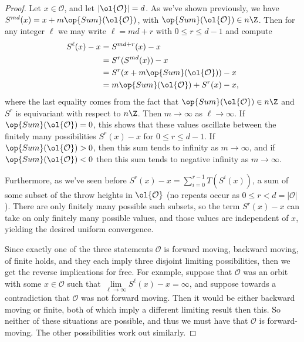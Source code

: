\documentclass[12nt]{article}
\theoremstyle{plain}
\begin{document}
\begin{proof}
Let $x \in \mathcal{O}$, and let $|\ol{\mathcal{O}}| = d$. As we've shown previously, we have $S^{md}(x) = x + m\op{Sum}(\ol{\mathcal{O}})$, with $\op{Sum}(\ol{\mathcal{O}}) \in n\Z$. Then for any integer $\ell$ we may write $\ell = md + r$ with $0 \leq r \leq d - 1$ and compute
\begin{align*}
S^{\ell}(x) - x &= S^{md + r}(x) - x \\
	&= S^r(S^{md}(x)) - x \\
	&= S^r(x + m \op{Sum}(\ol{\mathcal{O}})) - x \\
	&=  m \op{Sum}(\ol{\mathcal{O}}) + S^r(x)  - x,
\end{align*}
where the last equality comes from the fact that $\op{Sum}(\ol{\mathcal{O}}) \in n\Z$ and $S^r$ is equivariant with respect to $n\Z$. Then $m \to \infty$ as $\ell \to \infty$. If $\op{Sum}(\ol{\mathcal{O}}) = 0$, this shows that these values oscillate between the finitely many possibilities $S^r(x) - x$ for $0 \leq r \leq d - 1$. If $\op{Sum}(\ol{\mathcal{O}}) > 0$, then this sum tends to infinity as $m \to \infty$, and if $\op{Sum}(\ol{\mathcal{O}}) < 0$ then this sum tends to negative infinity as $m \to \infty$. 

Furthermore, as we've seen before $S^r(x) - x = \sum \limits_{i=0}^{r-1} T(S^i(x))$, a sum of some subset of the throw heights in $\ol{\mathcal{O}}$ (no repeats occur as $0 \leq r < d = |\mathcal{O}|$). There are only finitely many possible such subsets, so the term $S^r(x) - x$ can take on only finitely many possible values, and those values are independent of $x$, yielding the desired uniform convergence.

Since exactly one of the three statements $\mathcal{O}$ is forward moving, backward moving, of finite holds, and they each imply three disjoint limiting possibilities, then we get the reverse implications for free. For example, suppose that $\mathcal{O}$ was an orbit with some $x \in \mathcal{O}$ such that $\lim \limits_{\ell \to \infty} S^\ell(x) - x = \infty$, and suppose towards a contradiction that $\mathcal{O}$ was not forward moving. Then it would be either backward moving or finite, both of which imply a different limiting result then this. So neither of these situations are possible, and thus we must have that $\mathcal{O}$ is forward-moving. The other possibilities work out similarly.

\end{proof}


\newpage
\end{document}
